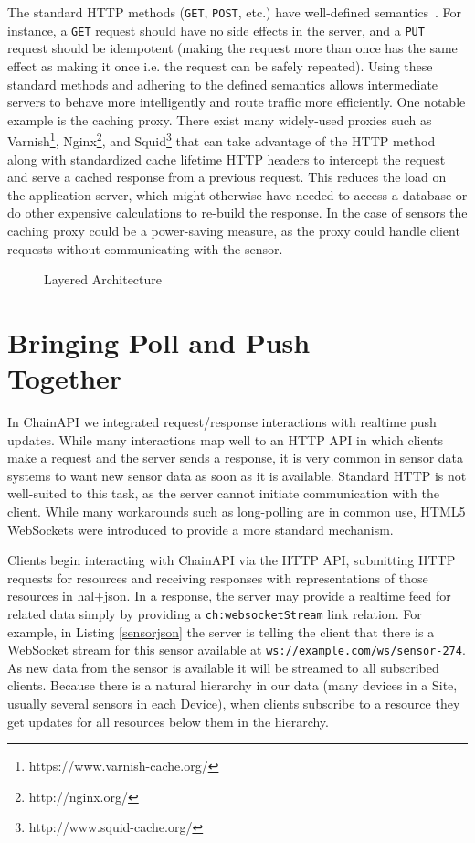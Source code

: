 \documentclass{acm_proc_article-sp}
\begin{document}
The standard HTTP methods (\texttt{GET}, \texttt{POST}, etc.) have well-defined
semantics~\cite{httpmethods}. For instance, a \texttt{GET} request should have
no side effects in the server, and a \texttt{PUT} request should be idempotent
(making the request more than once has the same effect as making it once i.e.
the request can be safely repeated). Using these standard methods and adhering
to the defined semantics allows intermediate servers to behave more
intelligently and route traffic more efficiently. One notable example is the
caching proxy. There exist many widely-used proxies such as
Varnish\footnote{https://www.varnish-cache.org/},
Nginx\footnote{http://nginx.org/}, and
Squid\footnote{http://www.squid-cache.org/} that can take advantage of the HTTP
method along with standardized cache lifetime HTTP headers to intercept the
request and serve a cached response from a previous request. This reduces the
load on the application server, which might otherwise have needed to access a
database or do other expensive calculations to re-build the response. In the
case of sensors the caching proxy could be a power-saving measure, as the proxy
could handle client requests without communicating with the sensor.

\begin{figure}
    \centering
    
    \caption{Layered Architecture}
    \label{chain_distributed}
\end{figure}

\section{Bringing Poll and Push\\ Together}

In ChainAPI we integrated request/response interactions with realtime push
updates. While many interactions map well to an HTTP API in which clients make
a request and the server sends a response, it is very common in sensor data
systems to want new sensor data as soon as it is available.  Standard HTTP is
not well-suited to this task, as the server cannot initiate communication with
the client. While many workarounds such as long-polling are in common use,
HTML5 WebSockets were introduced to provide a more standard mechanism.

Clients begin interacting with ChainAPI via the HTTP API, submitting HTTP
requests for resources and receiving responses with representations of those
resources in hal+json. In a response, the server may provide a realtime feed
for related data simply by providing a \texttt{ch:websocketStream} link
relation. For example, in Listing \ref{sensorjson} the server is telling the
client that there is a WebSocket stream for this sensor available at
\texttt{ws://example.com/ws/sensor-274}. As new data from the sensor is
available it will be streamed to all subscribed clients. Because there is a
natural hierarchy in our data (many devices in a Site, usually several sensors
in each Device), when clients subscribe to a resource they get updates for all
resources below them in the hierarchy.
\end{document}
